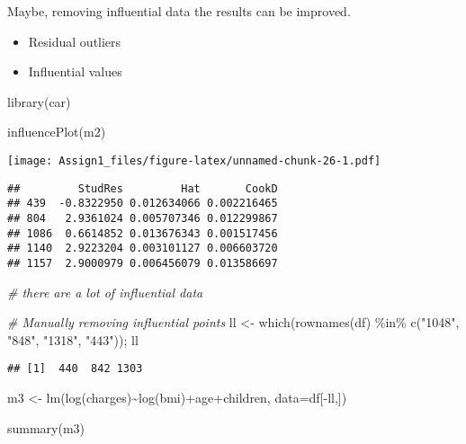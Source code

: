 \documentclass[
]{article}
\newenvironment{Shaded}{\begin{snugshade}}{\end{snugshade}}
\newcommand{\AttributeTok}[1]{\textcolor[rgb]{0.77,0.63,0.00}{#1}}
\newcommand{\CommentTok}[1]{\textcolor[rgb]{0.56,0.35,0.01}{\textit{#1}}}
\newcommand{\FunctionTok}[1]{\textcolor[rgb]{0.00,0.00,0.00}{#1}}
\newcommand{\NormalTok}[1]{#1}
\newcommand{\OtherTok}[1]{\textcolor[rgb]{0.56,0.35,0.01}{#1}}
\newcommand{\SpecialCharTok}[1]{\textcolor[rgb]{0.00,0.00,0.00}{#1}}
\newcommand{\StringTok}[1]{\textcolor[rgb]{0.31,0.60,0.02}{#1}}
\begin{document}
Maybe, removing influential data the results can be improved.

\begin{itemize}
\item
  Residual outliers
\item
  Influential values
\end{itemize}

\begin{Shaded}
\begin{Highlighting}[]
\FunctionTok{library}\NormalTok{(car)}

\FunctionTok{influencePlot}\NormalTok{(m2)}
\end{Highlighting}
\end{Shaded}

\texttt{[image: Assign1\_files/figure-latex/unnamed-chunk-26-1.pdf]}

\begin{verbatim}
##         StudRes         Hat       CookD
## 439  -0.8322950 0.012634066 0.002216465
## 804   2.9361024 0.005707346 0.012299867
## 1086  0.6614852 0.013676343 0.001517456
## 1140  2.9223204 0.003101127 0.006603720
## 1157  2.9000979 0.006456079 0.013586697
\end{verbatim}

\begin{Shaded}
\begin{Highlighting}[]
\CommentTok{\# there are a lot of influential data}

\CommentTok{\# Manually removing influential points}
\NormalTok{ll }\OtherTok{\textless{}{-}} \FunctionTok{which}\NormalTok{(}\FunctionTok{rownames}\NormalTok{(df) }\SpecialCharTok{\%in\%} \FunctionTok{c}\NormalTok{(}\StringTok{"1048"}\NormalTok{, }\StringTok{"848"}\NormalTok{, }\StringTok{"1318"}\NormalTok{, }\StringTok{"443"}\NormalTok{)); ll}
\end{Highlighting}
\end{Shaded}

\begin{verbatim}
## [1]  440  842 1303
\end{verbatim}

\begin{Shaded}
\begin{Highlighting}[]
\NormalTok{m3 }\OtherTok{\textless{}{-}} \FunctionTok{lm}\NormalTok{(}\FunctionTok{log}\NormalTok{(charges)}\SpecialCharTok{\textasciitilde{}}\FunctionTok{log}\NormalTok{(bmi)}\SpecialCharTok{+}\NormalTok{age}\SpecialCharTok{+}\NormalTok{children, }\AttributeTok{data=}\NormalTok{df[}\SpecialCharTok{{-}}\NormalTok{ll,])}

\FunctionTok{summary}\NormalTok{(m3)}
\end{Highlighting}
\end{Shaded}
\end{document}
